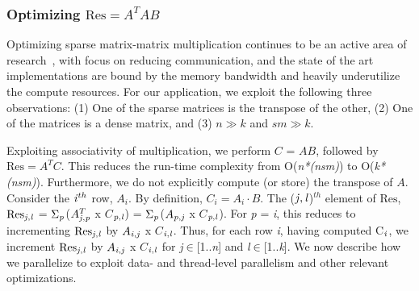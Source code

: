 \subsubsection{Optimizing $\mathrm{Res}=A^TAB$}
    Optimizing sparse matrix-matrix  multiplication continues to be an
    active area of research~\cite{ballard13,patwary15}, with focus on
    reducing communication, and the state of the art implementations
    are bound by the memory bandwidth and heavily
    underutilize the compute resources. 
    For our application, we exploit the following three observations:
    (1) One of the sparse matrices is the transpose of the other,   
    (2) One of the matrices is a dense matrix,   and    %
    (3) $n \gg k$ and $sm \gg k$.

    Exploiting associativity of multiplication, we perform $C$ = $AB$, 
    followed by $\mathrm{Res} = A^TC$. This reduces the run-time complexity from
    O({\it{n*(nsm)}}) to O({\it{k*(nsm)}}). Furthermore, we do not
    explicitly compute (or store) the transpose of $A$.  Consider the
    ${\it{i}}^{th}$ row, $A_i$. 
    By definition,  $C_i = A_i \cdot B$.
    The (${\it{j}},{\it{l}}$)$^{th}$ element of $\mathrm{Res}$,
    $\mathrm{Res}_{{\it{j}},{\it{l}}}$ =
    $\Sigma_{\it{p}}$($A^T_{{\it{j}},{\it{p}}}$ x $C$$_{{\it{p}},{\it{l}}}$) = 
    $\Sigma_{\it{p}}$($A_{{\it{p}},{\it{j}}}$ x
    $C$$_{{\it{p}},{\it{l}}}$).
    For {\it{p}} = {\it{i}}, this reduces to incrementing
    $\mathrm{Res}_{{\it{j}},{\it{l}}}$ by $A_{{\it{i}},{\it{j}}}$ x
    $C$$_{{\it{i}},{\it{l}}}$. 
    Thus, for each row {\it{i}}, 
    having computed C$_{\it{i}}$, we
    increment $\mathrm{Res}_{{\it{j}},{\it{l}}}$ 
    by $A_{{\it{i}},{\it{j}}}$ x $C$$_{{\it{i}},{\it{l}}}$
    for {\it{j}}$\in$[1..{\it{n}}] and {\it{l}}$\in$[1..{\it{k}}].
     We now describe how we parallelize  to exploit
     data- and thread-level parallelism and other relevant
     optimizations.





